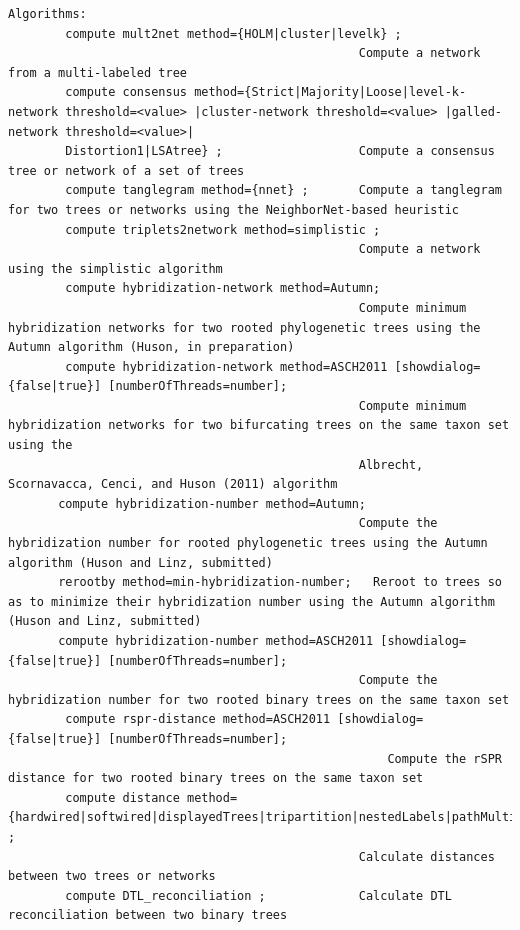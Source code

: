 \documentclass[11pt]{article}
\begin{document}
\begin{verbatim}
Algorithms:
        compute mult2net method={HOLM|cluster|levelk} ; 
                                                 Compute a network from a multi-labeled tree
        compute consensus method={Strict|Majority|Loose|level-k-network threshold=<value> |cluster-network threshold=<value> |galled-network threshold=<value>|
        Distortion1|LSAtree} ;                   Compute a consensus tree or network of a set of trees
        compute tanglegram method={nnet} ;       Compute a tanglegram for two trees or networks using the NeighborNet-based heuristic
        compute triplets2network method=simplistic ; 
                                                 Compute a network using the simplistic algorithm
        compute hybridization-network method=Autumn;
                                                 Compute minimum hybridization networks for two rooted phylogenetic trees using the Autumn algorithm (Huson, in preparation)
        compute hybridization-network method=ASCH2011 [showdialog={false|true}] [numberOfThreads=number];
                                                 Compute minimum hybridization networks for two bifurcating trees on the same taxon set using the
                                                 Albrecht, Scornavacca, Cenci, and Huson (2011) algorithm                                         
       compute hybridization-number method=Autumn;
                                                 Compute the hybridization number for rooted phylogenetic trees using the Autumn algorithm (Huson and Linz, submitted)
       rerootby method=min-hybridization-number;   Reroot to trees so as to minimize their hybridization number using the Autumn algorithm (Huson and Linz, submitted)
       compute hybridization-number method=ASCH2011 [showdialog={false|true}] [numberOfThreads=number];   
                                                 Compute the hybridization number for two rooted binary trees on the same taxon set 
        compute rspr-distance method=ASCH2011 [showdialog={false|true}] [numberOfThreads=number];                                               
	                                                 Compute the rSPR distance for two rooted binary trees on the same taxon set 
        compute distance method={hardwired|softwired|displayedTrees|tripartition|nestedLabels|pathMultiplicity} ;     
                                                 Calculate distances between two trees or networks
        compute DTL_reconciliation ;             Calculate DTL reconciliation between two binary trees


\end{verbatim}
\end{document}
